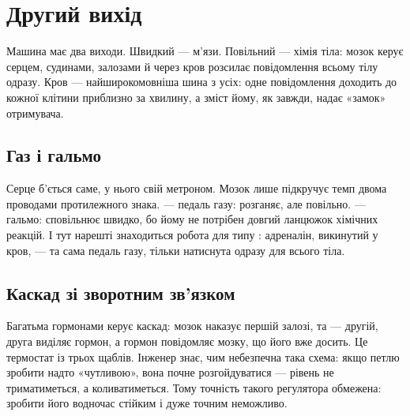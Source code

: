 \chapter{Другий вихід}

Машина має два виходи. Швидкий --- м'язи. Повільний --- хімія тіла: мозок керує серцем, судинами, залозами й через кров розсилає повідомлення всьому тілу одразу. Кров --- найширокомовніша шина з усіх: одне повідомлення доходить до кожної клітини приблизно за хвилину, а зміст йому, як завжди, надає «замок» отримувача.

\section*{Газ і гальмо}

Серце б'ється саме, у нього свій метроном. Мозок лише підкручує темп двома проводами протилежного знака.  --- педаль газу: розганяє, але повільно.  --- гальмо: сповільнює швидко, бо йому не потрібен довгий ланцюжок хімічних реакцій. І тут нарешті знаходиться робота для типу : адреналін, викинутий у кров, --- та сама педаль газу, тільки натиснута одразу для всього тіла.


\section*{Каскад зі зворотним зв'язком}

Багатьма гормонами керує каскад: мозок наказує першій залозі, та --- другій, друга виділяє гормон, а гормон повідомляє мозку, що його вже досить. Це термостат із трьох щаблів. Інженер знає, чим небезпечна така схема: якщо петлю зробити надто «чутливою», вона почне розгойдуватися --- рівень не триматиметься, а коливатиметься. Тому точність такого регулятора обмежена: зробити його водночас стійким і дуже точним неможливо.

